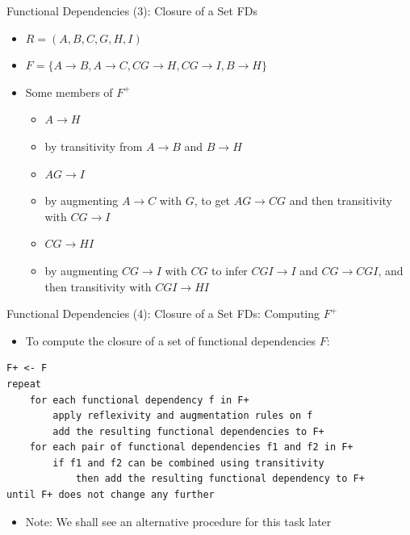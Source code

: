\documentclass[aspectratio=169, xcolor=dvipsnames]{beamer}
\begin{document}
\begin{frame}{Functional Dependencies (3): Closure of a Set FDs}
    \begin{itemize}[<+->]
        \item $R = (A, B, C, G, H, I)$
        \item $F = \{A \rightarrow B, A \rightarrow C, CG \rightarrow H, CG \rightarrow I, B \rightarrow H\}$
        \item Some members of $F^+$
        \begin{itemize}
            \item[$\triangleright$] $A \rightarrow H$
            \item[$\triangleright$] by transitivity from $A \rightarrow B$ and $B \rightarrow H$
            \item[$\triangleright$] $AG \rightarrow I$
            \item[$\triangleright$] by augmenting $A \rightarrow C$ with $G$, to get $AG \rightarrow CG$ and then transitivity with $CG \rightarrow I$
            \item[$\triangleright$] $CG \rightarrow HI$
            \item[$\triangleright$] by augmenting $CG \rightarrow I$ with $CG$ to infer $CGI \rightarrow I$ and $CG \rightarrow CGI$, and then transitivity with $CGI \rightarrow HI$
        \end{itemize}
    \end{itemize}
\end{frame}

\begin{frame}[fragile]{Functional Dependencies (4): Closure of a Set FDs: Computing $F^+$}
    \begin{itemize}[<+->]
        \item To compute the closure of a set of functional dependencies $F$:
    \end{itemize}
    \vspace{1em}
    \begin{verbatim}
F+ <- F
repeat
    for each functional dependency f in F+
        apply reflexivity and augmentation rules on f
        add the resulting functional dependencies to F+
    for each pair of functional dependencies f1 and f2 in F+
        if f1 and f2 can be combined using transitivity
            then add the resulting functional dependency to F+
until F+ does not change any further
    \end{verbatim}
    \begin{itemize}[<+(1)->]
        \item Note: We shall see an alternative procedure for this task later
    \end{itemize}
\end{frame}
\end{document}
